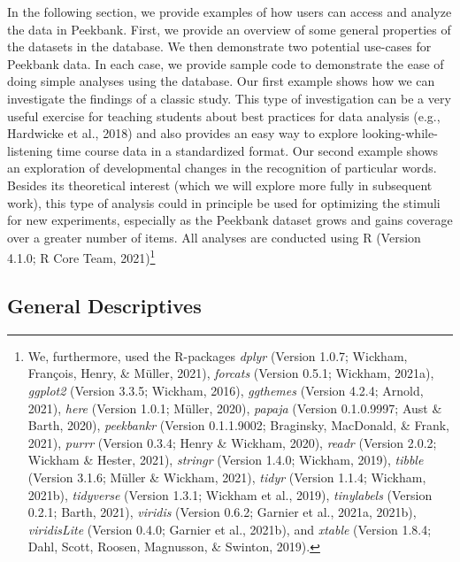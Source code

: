 \documentclass[
  english,
  man,floatsintext]{apa6}
\begin{document}
In the following section, we provide examples of how users can access and analyze the data in Peekbank.
First, we provide an overview of some general properties of the datasets in the database.
We then demonstrate two potential use-cases for Peekbank data.
In each case, we provide sample code to demonstrate the ease of doing simple analyses using the database.
Our first example shows how we can investigate the findings of a classic study.
This type of investigation can be a very useful exercise for teaching students about best practices for data analysis (e.g., Hardwicke et al., 2018) and also provides an easy way to explore looking-while-listening time course data in a standardized format.
Our second example shows an exploration of developmental changes in the recognition of particular words.
Besides its theoretical interest (which we will explore more fully in subsequent work), this type of analysis could in principle be used for optimizing the stimuli for new experiments, especially as the Peekbank dataset grows and gains coverage over a greater number of items.
All analyses are conducted using R (Version 4.1.0; R Core Team, 2021)\footnote{We, furthermore, used the R-packages \emph{dplyr} (Version 1.0.7; Wickham, François, Henry, \& Müller, 2021), \emph{forcats} (Version 0.5.1; Wickham, 2021a), \emph{ggplot2} (Version 3.3.5; Wickham, 2016), \emph{ggthemes} (Version 4.2.4; Arnold, 2021), \emph{here} (Version 1.0.1; Müller, 2020), \emph{papaja} (Version 0.1.0.9997; Aust \& Barth, 2020), \emph{peekbankr} (Version 0.1.1.9002; Braginsky, MacDonald, \& Frank, 2021), \emph{purrr} (Version 0.3.4; Henry \& Wickham, 2020), \emph{readr} (Version 2.0.2; Wickham \& Hester, 2021), \emph{stringr} (Version 1.4.0; Wickham, 2019), \emph{tibble} (Version 3.1.6; Müller \& Wickham, 2021), \emph{tidyr} (Version 1.1.4; Wickham, 2021b), \emph{tidyverse} (Version 1.3.1; Wickham et al., 2019), \emph{tinylabels} (Version 0.2.1; Barth, 2021), \emph{viridis} (Version 0.6.2; Garnier et al., 2021a, 2021b), \emph{viridisLite} (Version 0.4.0; Garnier et al., 2021b), and \emph{xtable} (Version 1.8.4; Dahl, Scott, Roosen, Magnusson, \& Swinton, 2019).}

\hypertarget{general-descriptives}{%
\subsection{General Descriptives}\label{general-descriptives}}
\end{document}
